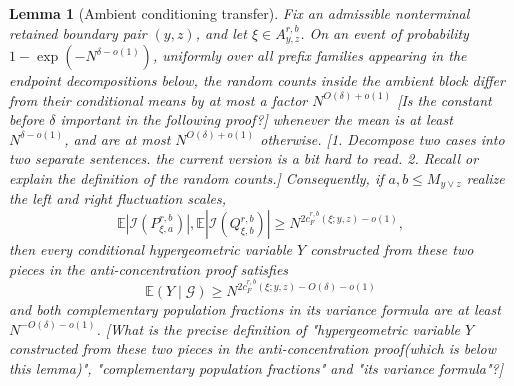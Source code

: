 \documentclass[11pt]{article}
\newtheorem{lem}{Lemma}
\newcommand{\cI}{\mathcal I}
\newcommand{\E}{\mathbb E}
\newcommand{\jscomment}[1]{\textup{\textsf{\color{blue}[#1]}}}
\begin{document}
\begin{lem}[Ambient conditioning transfer]
Fix an admissible nonterminal retained boundary pair \((y,z)\), and let
\(\xi\in A_{y,z}^{r,b}\). On an event of probability
\(1-\exp(-N^{\delta-o(1)})\), uniformly over all prefix families appearing
in the endpoint decompositions below, the random counts inside the ambient
block differ from their conditional means by at most a factor
\(N^{O(\delta)+o(1)}\) \jscomment{Is the constant before $\delta$ important in the following proof?} whenever the mean is at least
\(N^{\delta-o(1)}\), and are at most \(N^{O(\delta)+o(1)}\) otherwise.
\jscomment{1. Decompose two cases into two separate sentences. the current version is a bit hard to read. 2. Recall or explain the definition of the random counts.}
Consequently, if \(a,b\le M_{y\vee z}\) realize the left and right
fluctuation scales,
\[
    \E|\cI(P_{\xi,a}^{r,b})|,
    \E|\cI(Q_{\xi,b}^{r,b})|
    \ge N^{2c_F^{r,b}(\xi;y,z)-o(1)},
\]
then every conditional hypergeometric variable \(Y\) constructed from
these two pieces in the anti-concentration proof satisfies
\[
    \E(Y\mid\mathcal G)\ge
    N^{2c_F^{r,b}(\xi;y,z)-O(\delta)-o(1)}
\]
and both complementary population fractions in its variance formula are
at least \(N^{-O(\delta)-o(1)}\).
\jscomment{What is the precise definition of "hypergeometric variable \(Y\) constructed from
these two pieces in the anti-concentration proof(which is below this lemma)", "complementary population fractions" and "its variance formula"?}
\end{lem}
\end{document}
